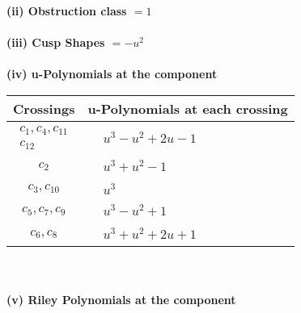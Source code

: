 \documentclass[1p]{elsarticle_modified}
\theoremstyle{definition}
\begin{document}
\flushleft \textbf{(ii) Obstruction class $= 1$}\\~\\
\flushleft \textbf{(iii) Cusp Shapes $= - u^2$}\\~\\
\newpage\renewcommand{\arraystretch}{1}
\flushleft \textbf{(iv) u-Polynomials at the component}\newline \\
\begin{tabular}{m{50pt}|m{274pt}}
Crossings & \hspace{64pt}u-Polynomials at each crossing \\
\hline $$\begin{aligned}c_{1},c_{4},c_{11}\\c_{12}\end{aligned}$$&$\begin{aligned}
&u^3- u^2+2 u-1
\end{aligned}$\\
\hline $$\begin{aligned}c_{2}\end{aligned}$$&$\begin{aligned}
&u^3+u^2-1
\end{aligned}$\\
\hline $$\begin{aligned}c_{3},c_{10}\end{aligned}$$&$\begin{aligned}
&u^3
\end{aligned}$\\
\hline $$\begin{aligned}c_{5},c_{7},c_{9}\end{aligned}$$&$\begin{aligned}
&u^3- u^2+1
\end{aligned}$\\
\hline $$\begin{aligned}c_{6},c_{8}\end{aligned}$$&$\begin{aligned}
&u^3+u^2+2 u+1
\end{aligned}$\\
\hline
\end{tabular}\\~\\
\newpage\renewcommand{\arraystretch}{1}
\flushleft \textbf{(v) Riley Polynomials at the component}\newline \\
\end{document}

